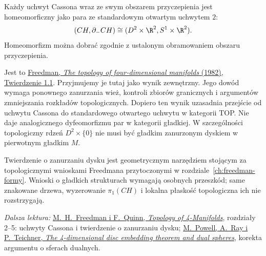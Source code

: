 \begin{twierdzenie}
\label{thm:casson-homeomorphism}
Każdy uchwyt Cassona wraz ze swym obszarem
przyczepienia jest homeomorficzny jako para ze
standardowym otwartym uchwytem $2$:
\[
 (CH,\partial_-CH)\cong
 (D^2\times\R^2,S^1\times\R^2).
\]
Homeomorfizm można dobrać zgodnie z ustalonym
obramowaniem obszaru przyczepienia.
\end{twierdzenie}

Jest to \href{https://www.maths.gla.ac.uk/~mpowell/1982_The%20topology%20of%20four-dimensional%20manifolds.pdf}
{Freedman, \emph{The topology of four-dimensional
manifolds} (1982), Twierdzenie 1.1}.
Przyjmujemy je tutaj jako wynik zewnętrzny.
Jego dowód wymaga ponownego zanurzania wież,
kontroli zbiorów granicznych i argumentów
zmniejszania rozkładów topologicznych. Dopiero
ten wynik uzasadnia przejście od uchwytu Cassona
do standardowego otwartego uchwytu w kategorii
TOP. Nie daje analogicznego dyfeomorfizmu par
w kategorii gładkiej. W szczególności topologiczny
rdzeń $D^2\times\{0\}$ nie musi być gładkim
zanurzonym dyskiem w pierwotnym gładkim $M$.

Twierdzenie o zanurzaniu dysku jest geometrycznym
narzędziem stojącym za topologicznymi wnioskami
Freedmana przytoczonymi w
rozdziale~\ref{ch:freedman-formy}. Wnioski o
gładkich strukturach wymagają osobnych przeszkód;
same znakowane drzewa, wyzerowanie $\pi_1(CH)$
i lokalna płaskość topologiczna ich nie rozstrzygają.

\par\smallskip
{\footnotesize\noindent\emph{Dalsza lektura:}
\href{https://archive.mpim-bonn.mpg.de/4789/2/FreedmanQuinn-TopologyOf4Manifolds-Reformatted2013.pdf}
{M.\ H.\ Freedman i F.\ Quinn, \emph{Topology of 4-Manifolds}},
rozdziały 2--5: uchwyty Cassona i twierdzenie o zanurzaniu dysku;
\href{https://arxiv.org/pdf/2006.05209}
{M.\ Powell, A.\ Ray i P.\ Teichner, \emph{The 4-dimensional
disc embedding theorem and dual spheres}}, korekta argumentu
o sferach dualnych.\par}

